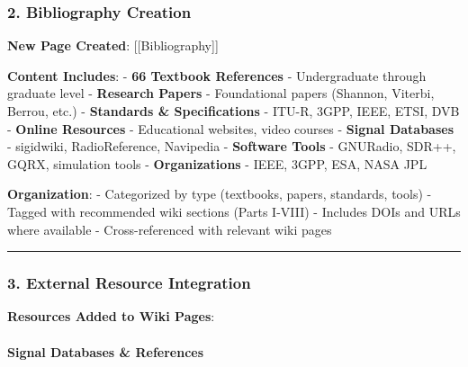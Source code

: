 \subsubsection{2. Bibliography Creation}\label{bibliography-creation}

\textbf{New Page Created}: {[}{[}Bibliography{]}{]}

\textbf{Content Includes}: - \textbf{66 Textbook References} -
Undergraduate through graduate level - \textbf{Research Papers} -
Foundational papers (Shannon, Viterbi, Berrou, etc.) - \textbf{Standards
\& Specifications} - ITU-R, 3GPP, IEEE, ETSI, DVB - \textbf{Online
Resources} - Educational websites, video courses - \textbf{Signal
Databases} - sigidwiki, RadioReference, Navipedia - \textbf{Software
Tools} - GNURadio, SDR++, GQRX, simulation tools -
\textbf{Organizations} - IEEE, 3GPP, ESA, NASA JPL

\textbf{Organization}: - Categorized by type (textbooks, papers,
standards, tools) - Tagged with recommended wiki sections (Parts I-VIII)
- Includes DOIs and URLs where available - Cross-referenced with
relevant wiki pages

\begin{center}\rule{0.5\linewidth}{0.5pt}\end{center}

\subsubsection{3. External Resource
Integration}\label{external-resource-integration}

\textbf{Resources Added to Wiki Pages}:

\paragraph{Signal Databases \&
References}\label{signal-databases-references}


